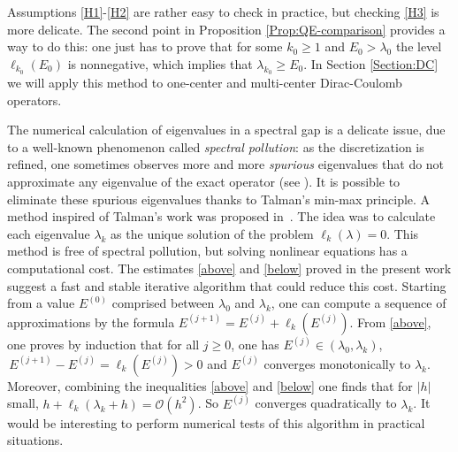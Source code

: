 \documentclass[12pt,reqno]{amsart}
\renewcommand{\(}{\left(}
\renewcommand{\)}{\right)}
\begin{document}
\begin{remark}\label{check H3} Assumptions \eqref{H1}-\eqref{H2} are rather easy to check in practice, but checking \eqref{H3} is more delicate. The second point in Proposition \ref{Prop:QE-comparison} provides a way to do this: one just has to prove that for some $k_0\geq 1$ and $E_0>\lambda_0$ the level $\ell_{k_0}(E_0)$ is nonnegative, which implies that $\lambda_{k_0}\geq E_0$. In Section \ref{Section:DC} we will apply this method to one-center and multi-center Dirac-Coulomb operators.
\end{remark}
\begin{remark}\label{iteration} The numerical calculation of eigenvalues in a spectral gap is a delicate issue, due to a well-known phenomenon called {\it spectral pollution}: as the discretization is refined, one sometimes observes more and more {\it spurious} eigenvalues that do not approximate any eigenvalue of the exact operator (see \cite{LewSer-10}). It is possible to eliminate these spurious eigenvalues thanks to Talman's min-max principle. A method inspired of Talman's work was proposed in~\cite{DolEstSerVan-00,DES03}. The idea was to calculate each eigenvalue $\lambda_k$ as the unique solution of the problem $\ell_k(\lambda)=0$. This method is free of spectral pollution, but solving nonlinear equations has a computational cost. The estimates \eqref{above} and \eqref{below} proved in the present work suggest a fast and stable iterative algorithm that could reduce this cost. Starting from a value $E^{(0)}$ comprised between $\lambda_0$ and $\lambda_k$, one can compute a sequence of approximations by the formula $E^{(j+1)}=E^{(j)}+\ell_k\left(E^{(j)}\right)$. From \eqref{above}, one proves by induction that for all $j\geq 0$, one has $E^{(j)}\in(\lambda_0,\lambda_k)$,   $\, E^{(j+1)}-E^{(j)}=\ell_k\left(E^{(j)}\right)>0$ and $E^{(j)}$ converges monotonically to $\lambda_k$. Moreover, combining the inequalities \eqref{above} and \eqref{below} one finds that for $\vert h \vert$ small, $h+\ell_k(\lambda_k+h)=\mathcal O(h^2)$. So $E^{(j)}$ converges quadratically to $\lambda_k$. It would be interesting to perform numerical tests of this algorithm in practical situations.
\end{remark}


\end{document}
